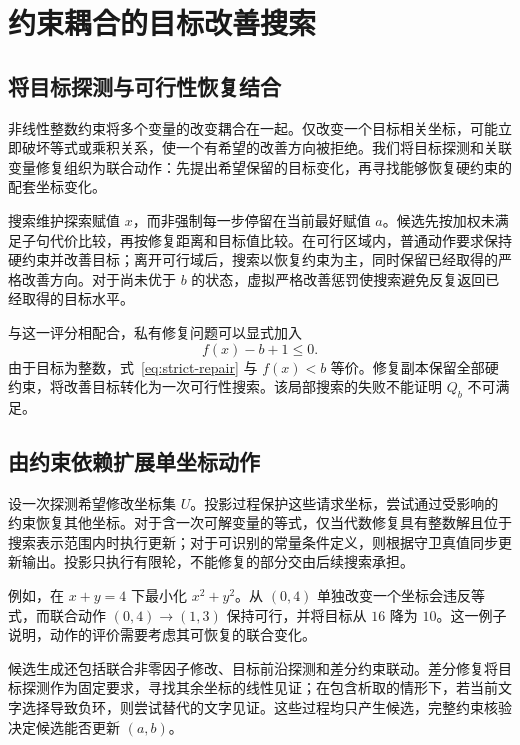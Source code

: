 \section{约束耦合的目标改善搜索}
\label{sec:coupled}

\subsection{将目标探测与可行性恢复结合}
非线性整数约束将多个变量的改变耦合在一起。仅改变一个目标相关坐标，可能立即破坏等式或乘积关系，使一个有希望的改善方向被拒绝。我们将目标探测和关联变量修复组织为联合动作：先提出希望保留的目标变化，再寻找能够恢复硬约束的配套坐标变化。

搜索维护探索赋值 $x$，而非强制每一步停留在当前最好赋值 $a$。候选先按加权未满足子句代价比较，再按修复距离和目标值比较。在可行区域内，普通动作要求保持硬约束并改善目标；离开可行域后，搜索以恢复约束为主，同时保留已经取得的严格改善方向。对于尚未优于 $b$ 的状态，虚拟严格改善惩罚使搜索避免反复返回已经取得的目标水平。

与这一评分相配合，私有修复问题可以显式加入
\begin{equation}
 f(x)-b+1\le0.
 \label{eq:strict-repair}
\end{equation}
由于目标为整数，式~\eqref{eq:strict-repair} 与 $f(x)<b$ 等价。修复副本保留全部硬约束，将改善目标转化为一次可行性搜索。该局部搜索的失败不能证明 $Q_b$ 不可满足。

\subsection{由约束依赖扩展单坐标动作}
设一次探测希望修改坐标集 $U$。投影过程保护这些请求坐标，尝试通过受影响的约束恢复其他坐标。对于含一次可解变量的等式，仅当代数修复具有整数解且位于搜索表示范围内时执行更新；对于可识别的常量条件定义，则根据守卫真值同步更新输出。投影只执行有限轮，不能修复的部分交由后续搜索承担。

例如，在 $x+y=4$ 下最小化 $x^2+y^2$。从 $(0,4)$ 单独改变一个坐标会违反等式，而联合动作 $(0,4)\to(1,3)$ 保持可行，并将目标从 $16$ 降为 $10$。这一例子说明，动作的评价需要考虑其可恢复的联合变化。

候选生成还包括联合非零因子修改、目标前沿探测和差分约束联动。差分修复将目标探测作为固定要求，寻找其余坐标的线性见证；在包含析取的情形下，若当前文字选择导致负环，则尝试替代的文字见证。这些过程均只产生候选，完整约束核验决定候选能否更新 $(a,b)$。

